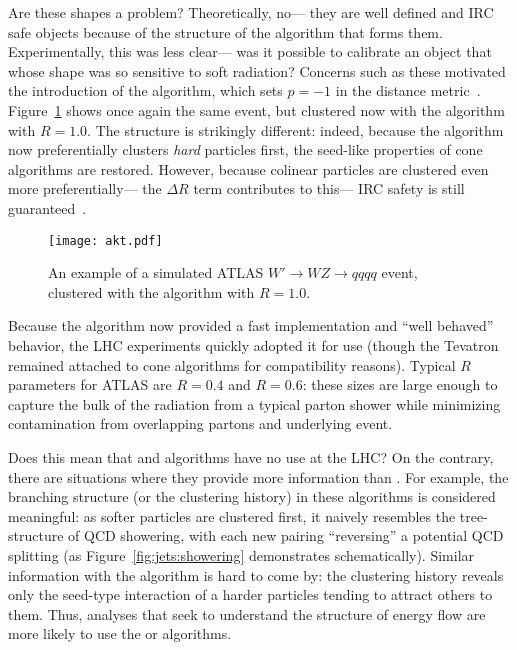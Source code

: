 



Are these shapes a problem? Theoretically, no--- they are well defined and IRC safe objects because of the structure of the algorithm that forms them. Experimentally, this was less clear--- was it possible to calibrate an object that whose shape was so sensitive to soft radiation? Concerns such as these motivated the introduction of the \antikt algorithm, which sets $p=-1$ in the distance metric~\cite{Jetography}. Figure~\ref{fig:jets:akt} shows once again the same event, but clustered now with the \antikt algorithm with $R=1.0$. The structure is strikingly different: indeed, because the algorithm now preferentially clusters \textit{hard} particles first, the seed-like properties of cone algorithms are restored. However, because colinear particles are clustered even more preferentially--- the $\Delta R$ term contributes to this--- IRC safety is still guaranteed~\cite{Jetography}.




\begin{figure}
\centering
\texttt{[image: akt.pdf]}
\label{fig:jets:akt}
\caption{An example of a simulated ATLAS $W'\rightarrow WZ\rightarrow qqqq$ event, clustered with the \antikt algorithm with $R=1.0$.}
\end{figure}


Because the \antikt algorithm now provided a fast implementation and ``well behaved'' behavior, the LHC experiments quickly adopted it for use (though the Tevatron remained attached to cone algorithms for compatibility reasons). Typical $R$ parameters for ATLAS are $R=0.4$ and $R=0.6$: these sizes are large enough to capture the bulk of the radiation from a typical parton shower while minimizing contamination from overlapping partons and underlying event.


Does this mean that \kt and \CA algorithms have no use at the LHC? On the contrary, there are situations where they provide more information than \antikt. For example, the branching structure (or the clustering history) in these algorithms is considered meaningful: as softer particles are clustered first, it naively resembles the tree-structure of QCD showering, with each new pairing ``reversing'' a potential QCD splitting (as Figure~\ref{fig:jets:showering} demonstrates schematically). Similar information with the \antikt algorithm is hard to come by: the clustering history reveals only the seed-type interaction of a harder particles tending to attract others to them. Thus, analyses that seek to understand the structure of energy flow are more likely to use the \kt or \CA algorithms.


